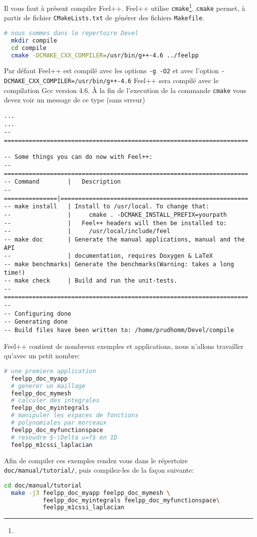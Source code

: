 Il vous faut à présent compiler Feel++. Feel++ utilise
\texttt{cmake}\footnote{}. \texttt{cmake} permet, à
partir de fichier \texttt{CMakeLists.txt} de générer des fichiers
\texttt{Makefile}.
\begin{lstlisting}[language=sh]
  # nous sommes dans le repertoire Devel
  mkdir compile
  cd compile
  cmake -DCMAKE_CXX_COMPILER=/usr/bin/g++-4.6 ../feelpp
\end{lstlisting}
Par défaut Feel++ est compilé avec les options \texttt{-g -O2} et avec
l'option \lstinline!-DCMAKE_CXX_COMPILER=/usr/bin/g++-4.6! Feel++ sera compilé
avec le compilation Gcc version 4.6.
À la fin de l'execution de la commande \texttt{cmake} vous devez voir un
message de ce type (sans erreur)
\begin{lstlisting}
...
...
-- =====================================================================

-- Some things you can do now with Feel++:
-- =====================================================================
-- Command        |   Description
-- ===============|=====================================================
-- make install   | Install to /usr/local. To change that:
--                |     cmake . -DCMAKE_INSTALL_PREFIX=yourpath
--                |   Feel++ headers will then be installed to:
--                |     /usr/local/include/feel
-- make doc       | Generate the manual applications, manual and the API
--                | documentation, requires Doxygen & LaTeX
-- make benchmarks| Generate the benchmarks(Warning: takes a long time!)
-- make check     | Build and run the unit-tests.
-- =====================================================================
--
-- Configuring done
-- Generating done
-- Build files have been written to: /home/prudhomm/Devel/compile
\end{lstlisting}

Feel++ contient de nombreux exemples et applications, nous n'allons travailler
qu'avec un petit nombre:
\begin{lstlisting}[language=sh]
  # une premiere application
  feelpp_doc_myapp
  # generer un maillage
  feelpp_doc_mymesh
  # calculer des integrales
  feelpp_doc_myintegrals
  # manipuler les espaces de fonctions
  # polynomiales par morceaux
  feelpp_doc_myfunctionspace
  # resoudre $-\Delta u=f$ en 1D
  feelpp_m1cssi_laplacian
\end{lstlisting}
Afin de compiler ces exemples rendez vous dans le répertoire
\texttt{doc/manual/tutorial/}, puis compilez-les de la fa\c {c}on suivante:
\begin{lstlisting}[language=sh]
  cd doc/manual/tutorial
  make -j3 feelpp_doc_myapp feelpp_doc_mymesh \
           feelpp_doc_myintegrals feelpp_doc_myfunctionspace\
           feelpp_m1cssi_laplacian
\end{lstlisting}

